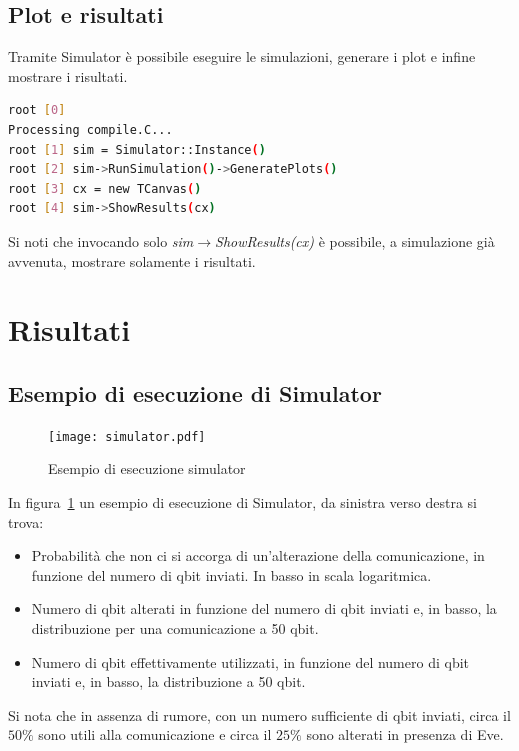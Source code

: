 \documentclass[11 pt, a4paper]{article}
\begin{document}
\subsection{Plot e risultati}
Tramite Simulator è possibile eseguire le simulazioni, generare i plot e infine mostrare i risultati.
\begin{lstlisting}[language=bash, style=myRoot]
root [0] 
Processing compile.C...
root [1] sim = Simulator::Instance()
root [2] sim->RunSimulation()->GeneratePlots()
root [3] cx = new TCanvas()
root [4] sim->ShowResults(cx)
\end{lstlisting}
Si noti che invocando solo \textit{sim$\to$ShowResults(cx)} è possibile, a simulazione già avvenuta, mostrare solamente i risultati.

\clearpage
\section{Risultati}
\subsection{Esempio di esecuzione di Simulator}

\begin{figure}[htb!]
\centering
\texttt{[image: simulator.pdf]}
\caption{Esempio di esecuzione simulator}
\label{fig:simulator}
\end{figure}

In figura~\ref{fig:simulator} un esempio di esecuzione di Simulator, da sinistra verso destra si trova:
\begin{itemize}
\item Probabilità che non ci si accorga di un'alterazione della comunicazione, in funzione del numero di qbit inviati. In basso in scala logaritmica.
\item Numero di qbit alterati in funzione del numero di qbit inviati e, in basso, la distribuzione per una comunicazione a 50 qbit.
\item Numero di qbit effettivamente utilizzati, in funzione del numero di qbit inviati e, in basso, la distribuzione a 50 qbit.
\end{itemize}
Si nota che in assenza di rumore, con un numero sufficiente di qbit inviati, circa il $50\%$ sono utili alla comunicazione e circa il $25\%$ sono alterati in presenza di Eve.

\clearpage
\end{document}
